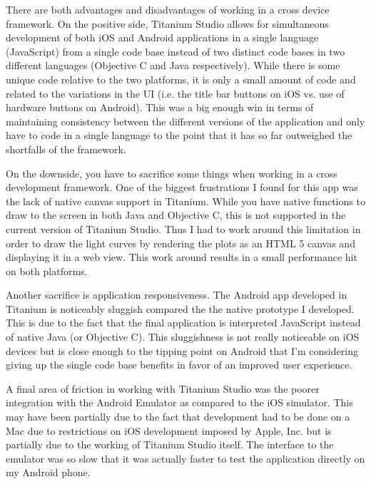 There are both advantages and disadvantages of working in a cross device framework.  On the positive side, Titanium Studio allows for simultaneous development of both iOS and Android applications in a single language (JavaScript) from a single code base instead of two distinct code bases in two different languages (Objective C and Java respectively).  While there is some unique code relative to the two platforms, it is only a small amount of code and related to the variations in the UI (i.e. the title bar buttons on iOS vs. use of hardware buttons on Android).  This was a big enough win in terms of maintaining consistency between the different versions of the application and only have to code in a single language to the point that it has so far outweighed the shortfalls of the framework.

On the downside, you have to sacrifice some things when working in a cross development framework.  One of the biggest frustrations I found for this app was the lack of native canvas support in Titanium.  While you have native functions to draw to the screen in both Java and Objective C, this is not supported in the current version of Titanium Studio.  Thus I had to work around this limitation in order to draw the light curves by rendering the plots as an HTML 5 canvas and displaying it in a web view.  This work around results in a small performance hit on both platforms.

Another sacrifice is application responsiveness.  The Android app developed in Titanium is noticeably sluggish compared the the native prototype I developed.  This is due to the fact that the final application is interpreted JavaScript instead of native Java (or Objective C).  This sluggishness is not really noticeable on iOS devices but is close enough to the tipping point on Android that I'm considering giving up the single code base benefits in favor of an improved user experience.

A final area of friction in working with Titanium Studio was the poorer integration with the Android Emulator as compared to the iOS simulator.  This may have been partially due to the fact that development had to be done on a Mac due to restrictions on iOS development imposed by Apple, Inc. but is partially due to the working of Titanium Studio itself.  The interface to the emulator was so slow that it was actually faster to test the application directly on my Android phone.


